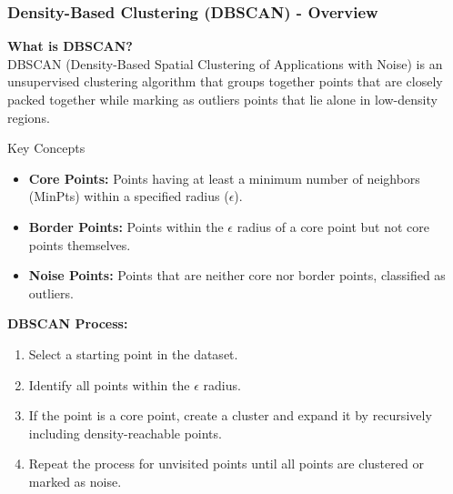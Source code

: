 \documentclass[aspectratio=169]{beamer}
\begin{document}
\begin{frame}[fragile]
    \frametitle{Density-Based Clustering (DBSCAN) - Overview}
    \textbf{What is DBSCAN?} \\
    DBSCAN (Density-Based Spatial Clustering of Applications with Noise) is an unsupervised clustering algorithm that groups together points that are closely packed together while marking as outliers points that lie alone in low-density regions.
    
    \begin{block}{Key Concepts}
        \begin{itemize}
            \item \textbf{Core Points:} Points having at least a minimum number of neighbors (MinPts) within a specified radius ($\epsilon$).
            \item \textbf{Border Points:} Points within the $\epsilon$ radius of a core point but not core points themselves.
            \item \textbf{Noise Points:} Points that are neither core nor border points, classified as outliers.
        \end{itemize}
    \end{block}

    \textbf{DBSCAN Process:}
    \begin{enumerate}
        \item Select a starting point in the dataset.
        \item Identify all points within the $\epsilon$ radius.
        \item If the point is a core point, create a cluster and expand it by recursively including density-reachable points.
        \item Repeat the process for unvisited points until all points are clustered or marked as noise.
    \end{enumerate}
\end{frame}
\end{document}
